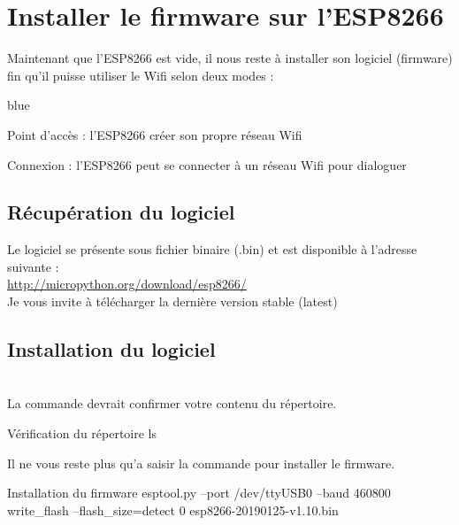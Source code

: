 {


\section{Installer le firmware sur l'ESP8266}

Maintenant que l'ESP8266 est vide, il nous reste à installer son logiciel (firmware) fin qu'il puisse utiliser le Wifi selon deux modes : 

\begin{items}{blue}{\Triangle}
    \item Point d'accès : l'ESP8266 créer son propre réseau Wifi
    \item Connexion : l'ESP8266 peut se connecter à un réseau Wifi pour dialoguer
\end{items}

\subsection{Récupération du logiciel}

Le logiciel se présente sous fichier binaire (.bin) et est disponible à l'adresse suivante : \\

\url{http://micropython.org/download/esp8266/}\\

Je vous invite à télécharger la dernière version stable (latest)


\subsection{Installation du logiciel}

 \\

La commande  devrait confirmer votre contenu du répertoire.

\begin{Bash}{Vérification du répertoire}
ls
\end{Bash}


Il ne vous reste plus qu'a saisir la commande pour installer le firmware. \\
\begin{Bash}{Installation du firmware}
esptool.py --port /dev/ttyUSB0 --baud 460800 write_flash --flash_size=detect 0 esp8266-20190125-v1.10.bin
\end{Bash}

}
